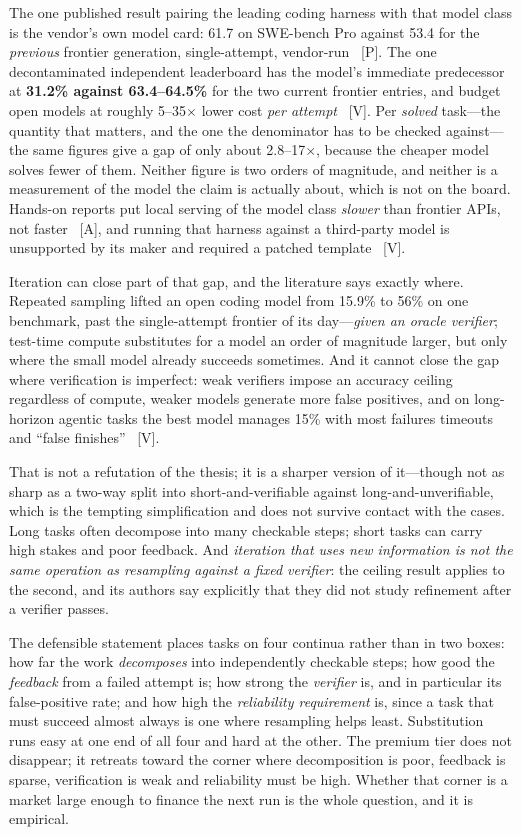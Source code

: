 The one published result pairing the leading coding harness with that model class is the vendor's own model card: 61.7 on SWE-bench Pro against 53.4 for the \emph{previous} frontier generation, single-attempt, vendor-run~\cite{qwen38-27b-card} [P]. The one decontaminated independent leaderboard has the model's immediate predecessor at \textbf{31.2\% against 63.4--64.5\%} for the two current frontier entries, and budget open models at roughly 5--35$\times$ lower cost \emph{per attempt}~\cite{swe-rebench} [V]. Per \emph{solved} task---the quantity that matters, and the one the denominator has to be checked against---the same figures give a gap of only about 2.8--17$\times$, because the cheaper model solves fewer of them. Neither figure is two orders of magnitude, and neither is a measurement of the model the claim is actually about, which is not on the board. Hands-on reports put local serving of the model class \emph{slower} than frontier APIs, not faster~\cite{swe-rebench} [A], and running that harness against a third-party model is unsupported by its maker and required a patched template~\cite{qwen38-27b-card} [V].

Iteration can close part of that gap, and the literature says exactly where. Repeated sampling lifted an open coding model from 15.9\% to 56\% on one benchmark, past the single-attempt frontier of its day---\emph{given an oracle verifier}; test-time compute substitutes for a model an order of magnitude larger, but only where the small model already succeeds sometimes. And it cannot close the gap where verification is imperfect: weak verifiers impose an accuracy ceiling regardless of compute, weaker models generate more false positives, and on long-horizon agentic tasks the best model manages 15\% with most failures timeouts and ``false finishes''~\cite{test-time-scaling} [V].

That is not a refutation of the thesis; it is a sharper version of it---though not as sharp as a two-way split into short-and-verifiable against long-and-unverifiable, which is the tempting simplification and does not survive contact with the cases. Long tasks often decompose into many checkable steps; short tasks can carry high stakes and poor feedback. And \emph{iteration that uses new information is not the same operation as resampling against a fixed verifier}: the ceiling result applies to the second, and its authors say explicitly that they did not study refinement after a verifier passes.

The defensible statement places tasks on four continua rather than in two boxes: how far the work \emph{decomposes} into independently checkable steps; how good the \emph{feedback} from a failed attempt is; how strong the \emph{verifier} is, and in particular its false-positive rate; and how high the \emph{reliability requirement} is, since a task that must succeed almost always is one where resampling helps least. Substitution runs easy at one end of all four and hard at the other. The premium tier does not disappear; it retreats toward the corner where decomposition is poor, feedback is sparse, verification is weak and reliability must be high. Whether that corner is a market large enough to finance the next run is the whole question, and it is empirical.

